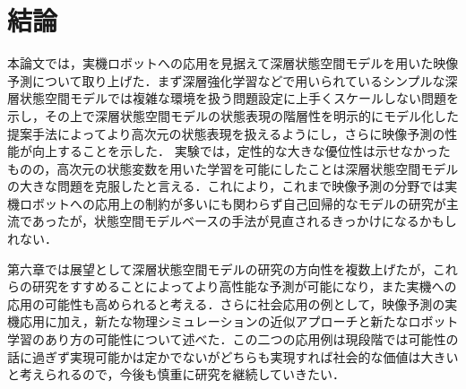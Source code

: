 \chapter{結論}
\label{chap:conclusion}

本論文では，実機ロボットへの応用を見据えて深層状態空間モデルを用いた映像予測について取り上げた．まず深層強化学習などで用いられているシンプルな深層状態空間モデルでは複雑な環境を扱う問題設定に上手くスケールしない問題を示し，その上で深層状態空間モデルの状態表現の階層性を明示的にモデル化した提案手法によってより高次元の状態表現を扱えるようにし，さらに映像予測の性能が向上することを示した．
実験では，定性的な大きな優位性は示せなかったものの，高次元の状態変数を用いた学習を可能にしたことは深層状態空間モデルの大きな問題を克服したと言える．これにより，これまで映像予測の分野では実機ロボットへの応用上の制約が多いにも関わらず自己回帰的なモデルの研究が主流であったが，状態空間モデルベースの手法が見直されるきっかけになるかもしれない．

第六章では展望として深層状態空間モデルの研究の方向性を複数上げたが，これらの研究をすすめることによってより高性能な予測が可能になり，また実機への応用の可能性も高められると考える．さらに社会応用の例として，映像予測の実機応用に加え，新たな物理シミュレーションの近似アプローチと新たなロボット学習のあり方の可能性について述べた．この二つの応用例は現段階では可能性の話に過ぎず実現可能かは定かでないがどちらも実現すれば社会的な価値は大きいと考えられるので，今後も慎重に研究を継続していきたい．
